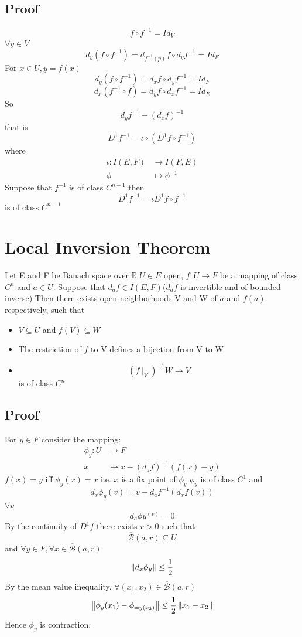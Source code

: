 \documentclass{book}
\begin{document}
\subsection*{Proof}
$$f\circ f^{-1}=Id_V$$ 
$\forall y\in V$
$$d_y(f\circ f^{-1})=d_{f^{-1}(p)}f\circ d_yf^{-1}=Id_F$$
For $x\in U,y=f(x)$
$$d_y(f\circ f^{-1})=d_xf\circ d_yf^{-1}=Id_F$$
$$d_x(f^{-1}\circ f)=d_yf\circ d_xf^{-1}=Id_E$$
So $$d_yf^{-1}-(d_xf)^{-1}$$ that is $$D^1f^{-1}=\iota\circ(D^1f\circ f^{-1})$$
where $$\begin{aligned}
    \iota: I(E,F) &\rightarrow I(F,E)\\
    \phi &\mapsto \phi^{-1}
\end{aligned}$$
Suppose that $f^{-1}$ is of class $C^{n-1}$ then $$D^1f^{-1}=\iota D^1f\circ f^{-1}$$ is of class $C^{n-1}$
\section{Local Inversion Theorem }
Let E and F be Banach space over $\mathbb{R}$ $ U\in E$
open, $f:U\rightarrow F$ be a mapping of class $C^n$ and $a\in U$. Suppose that $d_af\in I(E,F)$($d_af$ is invertible and of bounded inverse)
Then there exists open neighborhoods V and W of $a$ and $f(a)$ respectively, such that \begin{itemize}
    \item $V\subseteq U$ and $f(V)\subseteq W$
    \item The restriction of $f$ to V defines a bijection from V to W
    \item $$(f\mid_V)^{-1}W\rightarrow V$$ is of class $C^n$
\end{itemize}
\subsection{Proof}
For $y\in F$ consider the mapping:
$$
\begin{aligned}
    \phi_y:U &\rightarrow F\\
    x &\mapsto x-(d_af)^{-1}(f(x)-y)
\end{aligned}$$
$f(x)=y$ iff $\phi_y(x)=x$ i.e. $x$ is a fix point of $\phi_y$
$\phi_y$ is of class $C^1$ and $$d_x\phi_y(v)=v-d_af^{-1}(d_xf(v))$$
$\forall v$ $$d_a\phi y^{(v)}=0$$
By the continuity of $D^1f$ there exists $r>0$ such that $$\overline{\mathcal{B}}(a,r)\subseteq U$$ and $\forall y\in F,\forall x\in \overline{\mathcal{B}}(a,r)$
$$\left\lVert d_x\phi_y \right\rVert\leq\frac{1}{2}$$
By the mean value inequality. $\forall(x_1,x_2)\in \overline{\mathcal{B}}(a,r)$
$$\left\lVert \phi_y(x_1)-\phi_{=y(x_2)} \right\rVert\leq\frac{1}{2}\left\lVert x_1-x_2 \right\rVert$$
Hence $\phi_y$ is contraction.
\end{document}
